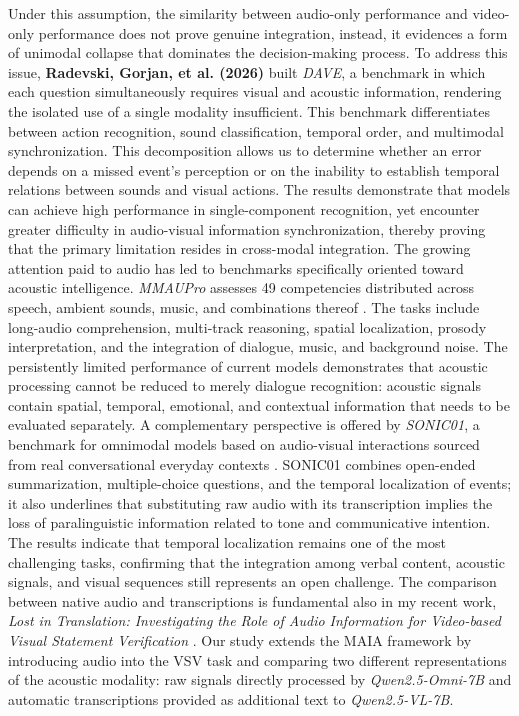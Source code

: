 Under this assumption, the similarity between audio-only performance and video-only performance does not prove genuine integration, instead, it evidences a form of unimodal collapse that dominates the decision-making process.
To address this issue, \textbf{Radevski, Gorjan, et al. (2026)} built \textit{\acs{DAVE}}\cite{radevski2026dave}, a benchmark in which each question simultaneously requires visual and acoustic information, rendering the isolated use of a single modality insufficient. This benchmark differentiates between action recognition, sound classification, temporal order, and multimodal synchronization. This decomposition allows us to determine whether an error depends on a missed event's perception or on the inability to establish temporal relations between sounds and visual actions. The results demonstrate that models can achieve high performance in single-component recognition, yet encounter greater difficulty in audio-visual information synchronization, thereby proving that the primary limitation resides in cross-modal integration.
The growing attention paid to audio has led to benchmarks specifically oriented toward acoustic intelligence. \textit{\acs{MMAUPro}} assesses 49 competencies distributed across speech, ambient sounds, music, and combinations thereof \cite{kumar2026mmaupro}. The tasks include long-audio comprehension, multi-track reasoning, spatial localization, prosody interpretation, and the integration of dialogue, music, and background noise. The persistently limited performance of current models demonstrates that acoustic processing cannot be reduced to merely dialogue recognition: acoustic signals contain spatial, temporal, emotional, and contextual information that needs to be evaluated separately.
A complementary perspective is offered by \textit{\acs{SONIC01}}, a benchmark for omnimodal models based on audio-visual interactions sourced from real conversational everyday contexts \cite{radwan2026sonic}. \acs{SONIC01} combines open-ended summarization, multiple-choice questions, and the temporal localization of events; it also underlines that substituting raw audio with its transcription implies the loss of paralinguistic information related to tone and communicative intention. The results indicate that temporal localization remains one of the most challenging tasks, confirming that the integration among verbal content, acoustic signals, and visual sequences still represents an open challenge.
The comparison between native audio and transcriptions is fundamental also in my recent work, \textit{Lost in Translation: Investigating the Role of Audio Information for Video-based Visual Statement Verification} \cite{deodati2026lost}. Our study extends the \acs{MAIA} framework by introducing audio into the \acs{VSV} task and comparing two different representations of the acoustic modality: raw signals directly processed by \textit{Qwen2.5-Omni-7B} and automatic transcriptions provided as additional text to \textit{Qwen2.5-VL-7B}.
